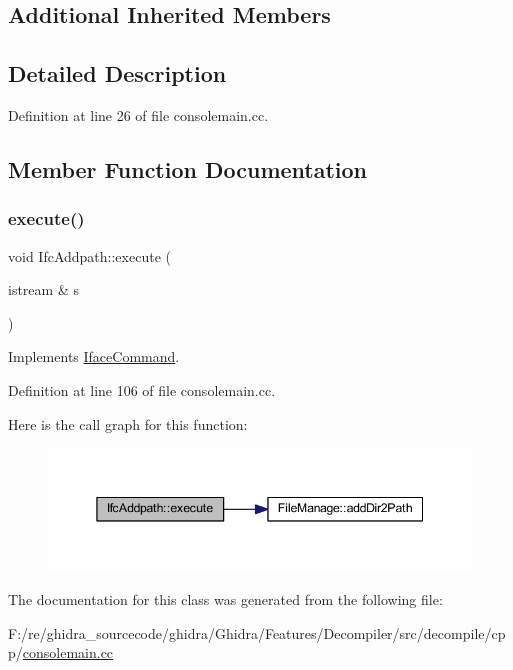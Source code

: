 \subsection*{Additional Inherited Members}


\subsection{Detailed Description}


Definition at line 26 of file consolemain.\+cc.



\subsection{Member Function Documentation}
\mbox{\label{class_ifc_addpath_abe711b93972455d4790fc6649cf67675}} 
\subsubsection{\texorpdfstring{execute()}{execute()}}
{\footnotesize\ttfamily void Ifc\+Addpath\+::execute (\begin{DoxyParamCaption}\item[{istream \&}]{s }\end{DoxyParamCaption})\hspace{0.3cm}{\ttfamily [virtual]}}



Implements \mbox{\hyperlink{class_iface_command_af10e29cee2c8e419de6efe9e680ad201}{Iface\+Command}}.



Definition at line 106 of file consolemain.\+cc.

Here is the call graph for this function\+:
\nopagebreak
\begin{figure}[H]
\begin{center}
\leavevmode
\includegraphics[width=345pt]{class_ifc_addpath_abe711b93972455d4790fc6649cf67675_cgraph}
\end{center}
\end{figure}


The documentation for this class was generated from the following file\+:\begin{DoxyCompactItemize}
\item 
F\+:/re/ghidra\+\_\+sourcecode/ghidra/\+Ghidra/\+Features/\+Decompiler/src/decompile/cpp/\mbox{\hyperlink{consolemain_8cc}{consolemain.\+cc}}\end{DoxyCompactItemize}

